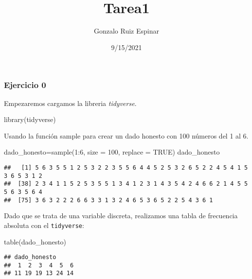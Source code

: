 \documentclass[
]{article}
\title{Tarea1}
\author{Gonzalo Ruiz Espinar}
\date{9/15/2021}
\newenvironment{Shaded}{\begin{snugshade}}{\end{snugshade}}
\newcommand{\AttributeTok}[1]{\textcolor[rgb]{0.77,0.63,0.00}{#1}}
\newcommand{\ConstantTok}[1]{\textcolor[rgb]{0.00,0.00,0.00}{#1}}
\newcommand{\DecValTok}[1]{\textcolor[rgb]{0.00,0.00,0.81}{#1}}
\newcommand{\FunctionTok}[1]{\textcolor[rgb]{0.00,0.00,0.00}{#1}}
\newcommand{\NormalTok}[1]{#1}
\newcommand{\OtherTok}[1]{\textcolor[rgb]{0.56,0.35,0.01}{#1}}
\newcommand{\SpecialCharTok}[1]{\textcolor[rgb]{0.00,0.00,0.00}{#1}}
\begin{document}
\maketitle

\hypertarget{ejercicio-0}{%
\subsubsection{Ejercicio 0}\label{ejercicio-0}}

Empezaremos cargamos la libreria \emph{tidyverse}.

\begin{Shaded}
\begin{Highlighting}[]
\FunctionTok{library}\NormalTok{(tidyverse)}
\end{Highlighting}
\end{Shaded}

Usando la función sample para crear un dado honesto con 100 números del
1 al 6.

\begin{Shaded}
\begin{Highlighting}[]
\NormalTok{dado\_honesto}\OtherTok{=}\FunctionTok{sample}\NormalTok{(}\DecValTok{1}\SpecialCharTok{:}\DecValTok{6}\NormalTok{, }\AttributeTok{size =} \DecValTok{100}\NormalTok{, }\AttributeTok{replace =} \ConstantTok{TRUE}\NormalTok{)}
\NormalTok{dado\_honesto}
\end{Highlighting}
\end{Shaded}

\begin{verbatim}
##   [1] 5 6 3 5 5 1 2 5 3 2 2 3 5 5 6 4 4 5 2 5 3 2 6 5 2 2 4 5 4 1 5 3 6 5 3 1 2
##  [38] 2 3 4 1 1 5 2 5 3 5 5 1 3 4 1 2 3 1 4 3 5 4 2 4 6 6 2 1 4 5 5 5 6 3 5 6 4
##  [75] 3 6 3 2 2 2 6 6 3 3 1 3 2 4 6 5 3 6 5 2 2 5 4 3 6 1
\end{verbatim}

Dado que se trata de una variable discreta, realizamos una tabla de
frecuencia absoluta con el \texttt{tidyverse}:

\begin{Shaded}
\begin{Highlighting}[]
\FunctionTok{table}\NormalTok{(dado\_honesto)}
\end{Highlighting}
\end{Shaded}

\begin{verbatim}
## dado_honesto
##  1  2  3  4  5  6 
## 11 19 19 13 24 14
\end{verbatim}
\end{document}
